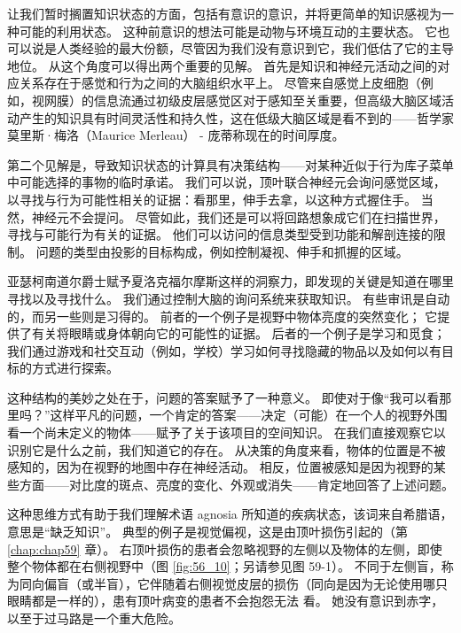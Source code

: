 让我们暂时搁置知识状态的方面，包括有意识的意识，并将更简单的知识感视为一种可能的利用状态。
这种前意识的想法可能是动物与环境互动的主要状态。
它也可以说是人类经验的最大份额，尽管因为我们没有意识到它，我们低估了它的主导地位。
从这个角度可以得出两个重要的见解。
首先是知识和神经元活动之间的对应关系存在于感觉和行为之间的大脑组织水平上。
尽管来自感觉上皮细胞（例如，视网膜）的信息流通过初级皮层感觉区对于感知至关重要，但高级大脑区域活动产生的知识具有时间灵活性和持久性，这在低级大脑区域是看不到的——哲学家莫里斯·梅洛（Maurice Merleau） - 庞蒂称现在的时间厚度。


第二个见解是，导致知识状态的计算具有决策结构——对某种近似于行为库子菜单中可能选择的事物的临时承诺。
我们可以说，顶叶联合神经元会询问感觉区域，以寻找与行为可能性相关的证据：看那里，伸手去拿，以这种方式握住手。
当然，神经元不会提问。
尽管如此，我们还是可以将回路想象成它们在扫描世界，寻找与可能行为有关的证据。
他们可以访问的信息类型受到功能和解剖连接的限制。
问题的类型由投影的目标构成，例如控制凝视、伸手和抓握的区域。


亚瑟柯南道尔爵士赋予夏洛克福尔摩斯这样的洞察力，即发现的关键是知道在哪里寻找以及寻找什么。
我们通过控制大脑的询问系统来获取知识。
有些审讯是自动的，而另一些则是习得的。
前者的一个例子是视野中物体亮度的突然变化；
它提供了有关将眼睛或身体朝向它的可能性的证据。
后者的一个例子是学习和觅食；
我们通过游戏和社交互动（例如，学校）学习如何寻找隐藏的物品以及如何以有目标的方式进行探索。


这种结构的美妙之处在于，问题的答案赋予了一种意义。
即使对于像“我可以看那里吗？”这样平凡的问题，一个肯定的答案——决定（可能）在一个人的视野外围看一个尚未定义的物体——赋予了关于该项目的空间知识。
在我们直接观察它以识别它是什么之前，我们知道它的存在。
从决策的角度来看，物体的位置是不被感知的，因为在视野的地图中存在神经活动。
相反，位置被感知是因为视野的某些方面——对比度的斑点、亮度的变化、外观或消失——肯定地回答了上述问题。


这种思维方式有助于我们理解术语 agnosia 所知道的疾病状态，该词来自希腊语，意思是“缺乏知识”。
典型的例子是视觉偏视，这是由顶叶损伤引起的（第 \ref{chap:chap59} 章）。
右顶叶损伤的患者会忽略视野的左侧以及物体的左侧，即使整个物体都在右侧视野中（图 \ref{fig:56_10}；另请参见图 59-1）。
不同于左侧盲，称为同向偏盲（或半盲），它伴随着右侧视觉皮层的损伤（同向是因为无论使用哪只眼睛都是一样的），患有顶叶病变的患者不会抱怨无法 看。
她没有意识到赤字，以至于过马路是一个重大危险。


